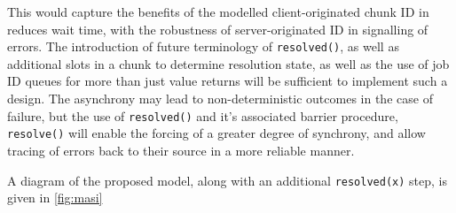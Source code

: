 \documentclass[a4paper,10pt]{article}
\begin{document}
This would capture the benefits of the modelled client-originated chunk ID in
reduces wait time, with the robustness of server-originated ID in signalling of
errors.
The introduction of future terminology of \texttt{resolved()}, as well as
additional slots in a chunk to determine resolution state, as well as the use
of job ID queues for more than just value returns will be sufficient to
implement such a design.
The asynchrony may lead to non-deterministic outcomes in the case of failure,
but the use of \texttt{resolved()} and it's associated barrier procedure,
\texttt{resolve()} will enable the forcing of a greater degree of synchrony,
and allow tracing of errors back to their source in a more reliable manner.

A diagram of the proposed model, along with an additional \texttt{resolved(x)}
step, is given in \ref{fig:masi}
\end{document}
